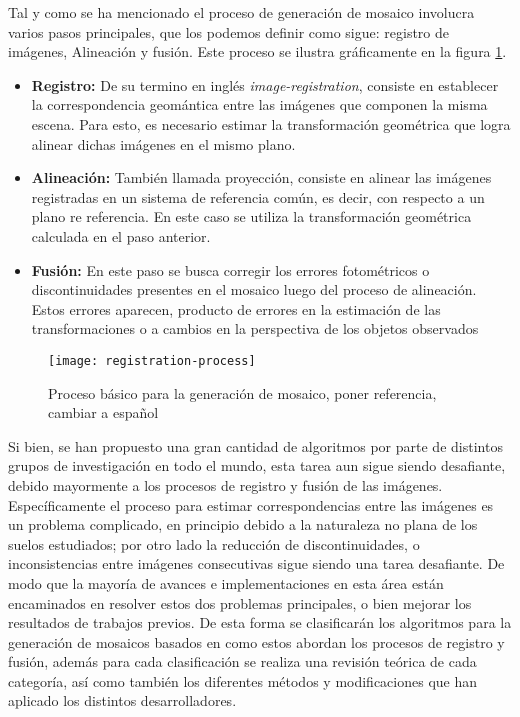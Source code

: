 Tal y como se ha mencionado el proceso de generación de mosaico involucra varios pasos principales, que los podemos definir como sigue: registro de imágenes, Alineación y fusión. Este proceso se ilustra gráficamente en la figura \ref{imagen:mosaic-process}.

\begin{itemize}
	\item \textbf{Registro:} De su termino en inglés \textit{image-registration}, consiste en establecer la correspondencia geomántica entre las imágenes que componen la misma escena. Para esto, es necesario estimar la transformación geométrica que logra alinear dichas imágenes en el mismo plano.
	
	\item \textbf{Alineación:} También llamada proyección, consiste en alinear las imágenes registradas en un sistema de referencia común, es decir, con respecto a un plano re referencia. En este caso se utiliza la transformación geométrica calculada en el paso anterior.
	
	\item \textbf{Fusión:} En este paso se busca corregir los errores fotométricos o discontinuidades presentes en el mosaico luego del proceso de alineación. Estos errores aparecen, producto de errores en la estimación de las transformaciones o a cambios en la perspectiva de los objetos observados
\end{itemize}

\begin{figure}[H]
	\centerline{
		\texttt{[image: registration-process]}}
	\caption{Proceso básico para la generación de mosaico, poner referencia, cambiar a español}
	\label{imagen:mosaic-process}
\end{figure}

Si bien, se han propuesto una gran cantidad de algoritmos por parte de distintos grupos de investigación en todo el mundo, esta tarea aun sigue siendo desafiante, debido mayormente a los procesos de registro y fusión de las imágenes. Específicamente el proceso para estimar correspondencias entre las imágenes es un problema complicado, en principio debido a la naturaleza no plana de los suelos estudiados; por otro lado la reducción de discontinuidades, o inconsistencias entre imágenes consecutivas sigue siendo una tarea desafiante. De modo que la mayoría de avances e implementaciones en esta área están encaminados en resolver estos dos problemas principales, o bien mejorar los resultados de trabajos previos. De esta forma se clasificarán los algoritmos para la generación de mosaicos basados en como estos abordan los procesos de registro y fusión, además para cada clasificación se realiza una revisión teórica de cada categoría, así como también los diferentes métodos y modificaciones que han aplicado los distintos desarrolladores. 

